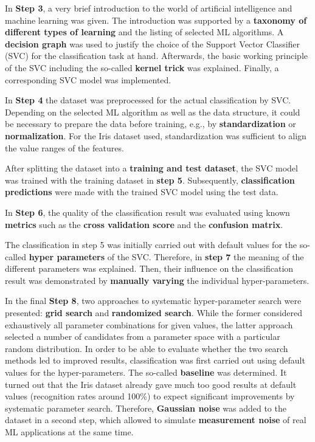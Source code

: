 \documentclass [oneside,10pt,a4paper,ngerman,BCOR10mm,headsepline,parindent,final]{scrartcl}
\begin{document}
In \textbf{Step 3}, a very brief introduction to the world of artificial
intelligence and machine learning was given. The introduction was
supported by a \textbf{taxonomy of different types of learning} and the
listing of selected ML algorithms. A \textbf{decision graph} was used to
justify the choice of the Support Vector Classifier (SVC) for the
classification task at hand. Afterwards, the basic working principle of
the SVC including the so-called \textbf{kernel trick} was explained.
Finally, a corresponding SVC model was implemented.

In \textbf{Step 4} the dataset was preprocessed for the actual
classification by SVC. Depending on the selected ML algorithm as well as
the data structure, it could be necessary to prepare the data before
training, e.g., by \textbf{standardization} or \textbf{normalization}.
For the Iris dataset used, standardization was sufficient to align the
value ranges of the features.

After splitting the dataset into a \textbf{training and test dataset},
the SVC model was trained with the training dataset in \textbf{step 5}.
Subsequently, \textbf{classification predictions} were made with the
trained SVC model using the test data.

In \textbf{Step 6}, the quality of the classification result was
evaluated using known \textbf{metrics} such as the \textbf{cross
validation score} and the \textbf{confusion matrix}.

The classification in step 5 was initially carried out with default
values for the so-called \textbf{hyper parameters} of the SVC.
Therefore, in \textbf{step 7} the meaning of the different parameters
was explained. Then, their influence on the classification result was
demonstrated by \textbf{manually varying} the individual
hyper-parameters.

In the final \textbf{Step 8}, two approaches to systematic
hyper-parameter search were presented: \textbf{grid search} and
\textbf{randomized search}. While the former considered exhaustively all
parameter combinations for given values, the latter approach selected a
number of candidates from a parameter space with a particular random
distribution. In order to be able to evaluate whether the two search
methods led to improved results, classification was first carried out
using default values for the hyper-parameters. The so-called
\textbf{baseline} was determined. It turned out that the Iris dataset
already gave much too good results at default values (recognition rates
around 100\%) to expect significant improvements by systematic parameter
search. Therefore, \textbf{Gaussian noise} was added to the dataset in a
second step, which allowed to simulate \textbf{measurement noise} of
real ML applications at the same time.
\end{document}
